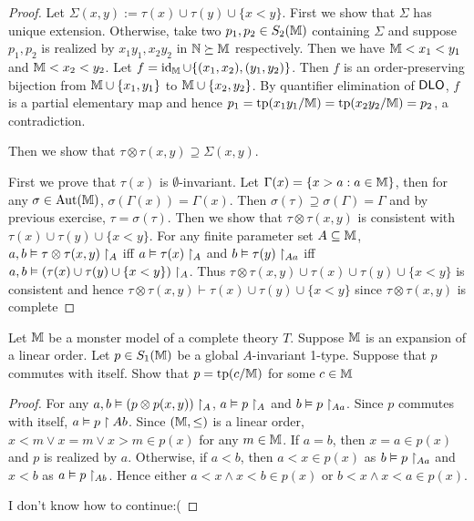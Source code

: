 \documentclass[11pt]{article}
\begin{document}
\begin{proof}
Let \(\Sigma(x,y):=\tau(x)\cup\tau(y)\cup\{x<y\}\). First we show that \(\Sigma\) has unique extension. Otherwise, take
two \(p_1,p_2\in S_2(\mathbb{M})\) containing \(\Sigma\) and suppose \(p_1,p_2\) is realized by \(x_1y_1, x_2y_2\) in \(\mathbb{N}\succeq\mathbb{M}\) respectively.
Then we have \(\mathbb{M}<x_1<y_1\) and \(\mathbb{M}<x_2<y_2\). Let \(f=\operatorname{id}_{\mathbb{M}}\cup\{(x_1,x_2),(y_1,y_2)\}\). Then \(f\) is an
order-preserving bijection from \(\mathbb{M}\cup\{x_1,y_1\}\) to \(\mathbb{M}\cup\{x_2,y_2\}\). By quantifier elimination
of \(\operatorname{\textsf{DLO}}\), \(f\) is a partial elementary map and hence \(p_1=\operatorname{tp}(x_1y_1/\mathbb{M})=\operatorname{tp}(x_2y_2/\mathbb{M})=p_2\), a
contradiction.

Then we show that \(\tau\otimes\tau(x,y)\supseteq\Sigma(x,y)\).

First we prove that \(\tau(x)\) is \(\emptyset\)-invariant. Let \(\Gamma(x)=\{x>a:a\in\mathbb{M}\}\), then for
any \(\sigma\in\operatorname{\text{Aut}}(\mathbb{M})\), \(\sigma(\Gamma(x))=\Gamma(x)\). Then \(\sigma(\tau)\supseteq\sigma(\Gamma)=\Gamma\) and by previous exercise, \(\tau=\sigma(\tau)\).
Then we show that \(\tau\otimes\tau(x,y)\) is consistent with \(\tau(x)\cup\tau(y)\cup\{x<y\}\). For any finite parameter
set \(A\subseteq\mathbb{M}\), \(a,b\vDash\tau\otimes\tau(x,y)\upharpoonright_A\) iff \(a\vDash\tau(x)\upharpoonright_A\) and \(b\vDash\tau(y)\upharpoonright_{Aa}\) iff \(a,b\vDash(\tau(x)\cup\tau(y)\cup\{x<y\})\upharpoonright_A\).
Thus \(\tau\otimes\tau(x,y)\cup\tau(x)\cup\tau(y)\cup\{x<y\}\) is consistent and hence
 \(\tau\otimes\tau(x,y)\vdash\tau(x)\cup\tau(y)\cup\{x<y\}\) since \(\tau\otimes\tau(x,y)\) is complete
\end{proof}

\begin{exercise}
Let \(\mathbb{M}\) be a monster model of a complete theory \(T\). Suppose \(\mathbb{M}\) is an expansion of a linear
order. Let \(p\in S_1(\mathbb{M})\) be a global \(A\)-invariant 1-type. Suppose that \(p\) commutes with itself.
Show that \(p=\operatorname{tp}(c/\mathbb{M})\) for some \(c\in\mathbb{M}\)
\end{exercise}

\begin{proof}
For any \(a,b\vDash (p\otimes p(x,y))\upharpoonright_A\), \(a\vDash p\upharpoonright_A\) and \(b\vDash p\upharpoonright_{Aa}\). Since \(p\) commutes with
itself, \(a\vDash p\upharpoonright Ab\). Since \((\mathbb{M},\le)\) is a linear order, \(x<m\vee x=m\vee x>m\in p(x)\) for any \(m\in\mathbb{M}\).
If \(a=b\), then \(x=a\in p(x)\) and \(p\) is realized by \(a\). Otherwise, if \(a<b\),
then \(a<x\in p(x)\) as \(b\vDash p\upharpoonright_{Aa}\) and \(x<b\) as \(a\vDash p\upharpoonright_{Ab}\). Hence either \(a<x\wedge x<b\in p(x)\)
or \(b<x\wedge x<a\in p(x)\).


I don't know how to continue:(
\end{proof}
\end{document}

